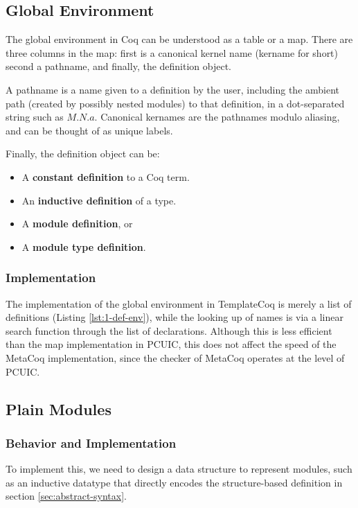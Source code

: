 \subsection{Global Environment}
The global environment in Coq can be understood as a table or a map. There are
three columns in the map: first is a canonical kernel name (kername for short)
second a pathname, and finally, the definition object. 


A pathname is a name given to a definition by the user, including the ambient
path (created by possibly nested modules) to that definition, in a dot-separated
string such as $M.N.a$. Canonical kernames are the pathnames modulo aliasing,
and can be thought of as unique labels.

Finally, the definition object can be:
\begin{itemize}
\item A \textbf{constant definition} to a Coq term.
\item An \textbf{inductive definition} of a type.
\item A \textbf{module definition}, or 
\item A \textbf{module type definition}.
\end{itemize}

\subsubsection{Implementation}

The implementation of the global environment in TemplateCoq is merely a list of
definitions (Listing \ref{lst:1-def-env}), while the looking up of names is via
a linear search function through the list of declarations. Although this is less
efficient than the map implementation in PCUIC, this does not affect the speed
of the MetaCoq implementation, since the checker of MetaCoq operates at the
level of PCUIC.

\subsection{Plain Modules}
\label{sec:plainmodules}

\subsubsection{Behavior and Implementation}

To implement this, we need to design a data structure to represent modules, such
as an inductive datatype that directly encodes the structure-based definition in
section \ref{sec:abstract-syntax}.

